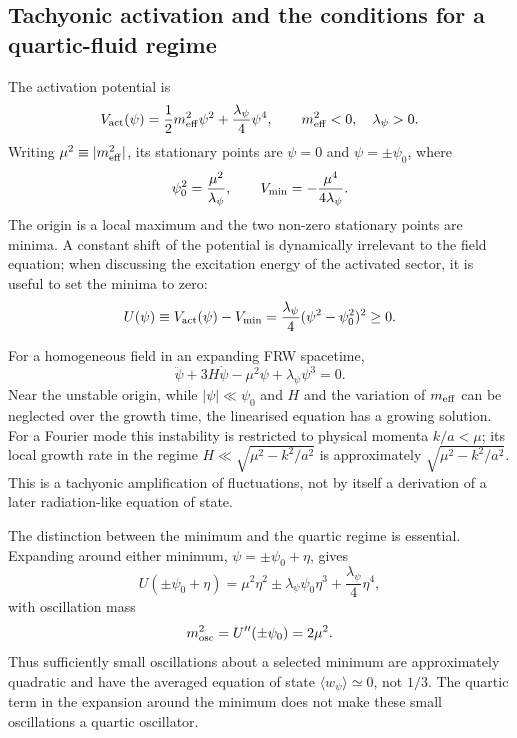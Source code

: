 \documentclass[epj]{svjour}
\begin{document}
\subsection{Tachyonic activation and the conditions for a quartic-fluid regime}
\label{sec:tachyonic_to_quartic}

The activation potential is
\begin{equation}
V_{\rm act}(\psi)=\frac{1}{2}m_{\rm eff}^2\psi^2
+\frac{\lambda_\psi}{4}\psi^4,\qquad
m_{\rm eff}^2<0,\quad \lambda_\psi>0.
\label{eq:V_double_well_corrected}
\end{equation}
Writing $\mu^2\equiv |m_{\rm eff}^2|$, its stationary points are
$\psi=0$ and $\psi=\pm\psi_0$, where
\begin{equation}
\psi_0^2=\frac{\mu^2}{\lambda_\psi},\qquad
V_{\rm min}=-\frac{\mu^4}{4\lambda_\psi}.
\end{equation}
The origin is a local maximum and the two non-zero stationary points are
minima. A constant shift of the potential is dynamically irrelevant to the
field equation; when discussing the excitation energy of the activated
sector, it is useful to set the minima to zero:
\begin{equation}
U(\psi)\equiv V_{\rm act}(\psi)-V_{\rm min}
=\frac{\lambda_\psi}{4}(\psi^2-\psi_0^2)^2\geq0.
\label{eq:U_double_well_corrected}
\end{equation}

For a homogeneous field in an expanding FRW spacetime,
\begin{equation}
\ddot\psi+3H\dot\psi-\mu^2\psi+\lambda_\psi\psi^3=0.
\label{eq:psi_eom_full}
\end{equation}
Near the unstable origin, while $|\psi|\ll\psi_0$ and $H$ and the
variation of $m_{\rm eff}$ can be neglected over the growth time, the
linearised equation has a growing solution. For a Fourier mode this
instability is restricted to physical momenta $k/a<\mu$; its local growth
rate in the regime $H\ll\sqrt{\mu^2-k^2/a^2}$ is approximately
$\sqrt{\mu^2-k^2/a^2}$. This is a tachyonic amplification of fluctuations,
not by itself a derivation of a later radiation-like equation of state.

The distinction between the minimum and the quartic regime is essential.
Expanding around either minimum, $\psi=\pm\psi_0+\eta$, gives
\begin{equation}
U(\pm\psi_0+\eta)=\mu^2\eta^2
\pm\lambda_\psi\psi_0\eta^3
+\frac{\lambda_\psi}{4}\eta^4,
\end{equation}
with oscillation mass
\begin{equation}
m_{\rm osc}^2=U''(\pm\psi_0)=2\mu^2.
\label{eq:minimum_expansion_corrected}
\end{equation}
Thus sufficiently small oscillations about a selected minimum are
approximately quadratic and have the averaged equation of state
$\langle w_\psi\rangle\simeq0$, not $1/3$. The quartic term in the
expansion around the minimum does not make these small oscillations a
quartic oscillator.
\end{document}
